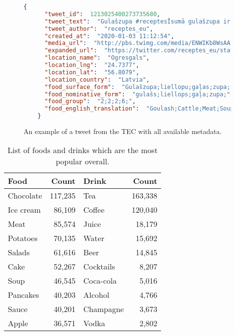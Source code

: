 \documentclass{IOS-Book-Article}
\begin{document}
\begin{figure}[t]
    \begin{small}
    \begin{lstlisting}[language=json,numbers=none]
    {
      "tweet_id":  1213025400273735680,
      "tweet_text":  "Gulašzupa #receptesĪsumā gulašzupa ir gana vienkārša liellopu gaļas bāzēta zupa https://t.co/OnqDwotQr0 https://t.co/Z2tAodyj9M",
      "tweet_author":  "receptes_eu",
      "created_at":  "2020-01-03 11:12:54",
      "media_url":  "http://pbs.twimg.com/media/ENWIKb8WsAAiLKE.jpg",
      "expanded_url":  "https://twitter.com/receptes_eu/status/1213025400273735680/photo/1",
      "location_name":  "Ogresgals",
      "location_lng":  "24.7377",
      "location_lat":  "56.8079",
      "location_country":  "Latvia",
      "food_surface_form":  "Gulašzupa;liellopu;gaļas;zupa;",
      "food_nominative_form":  "gulašs;liellops;gaļa;zupa;",
      "food_group":  "2;2;2;6;",
      "food_english_translation":  "Goulash;Cattle;Meat;Soup;",
    }
    \end{lstlisting}
    \end{small}
  \caption{An example of a tweet from the TEC with all available metadata.}
  \label{fig:tweet-example}
\end{figure}



\begin{table}[b]
    \caption{List of foods and drinks which are the most popular overall.}
    \begin{tabular}{lrlr}
    \hline
    \textbf{Food} & \textbf{Count} & \textbf{Drink} & \textbf{Count}  \\ \hline 
    Chocolate & 117,235 & Tea & 163,338 \\ 
    Ice cream & 86,109 & Coffee & 120,040 \\ 
    Meat & 85,574 & Juice & 18,179 \\ 
    Potatoes & 70,135 & Water & 15,692 \\ 
    Salads & 61,616 & Beer & 14,845 \\ 
    Cake & 52,267 & Cocktails & 8,207 \\
    Soup & 46,545 & Coca-cola & 5,016 \\
    Pancakes & 40,203 & Alcohol & 4,766 \\
    Sauce & 40,201 & Champagne & 3,673 \\
    Apple & 36,571 & Vodka & 2,802 \\ \hline
    \end{tabular}
  \label{tab:top-foods-drinks}
\end{table}
\end{document}
